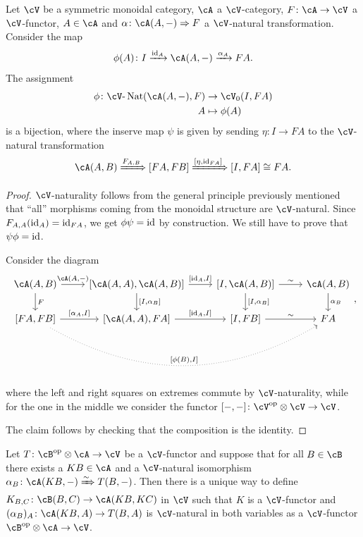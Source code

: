 \documentclass[a4paper,11pt,oneside,openany]{scrbook}
\begin{document}
\begin{thm}
    Let $\cV$ be a symmetric monoidal category, $\cA$ a $\cV$-category, $F\colon\cA\rightarrow\cV$ a $\cV$-functor, $A\in\cA$ and $\alpha\colon\cA(A,-)\Rightarrow F$ a $\cV$-natural transformation. Consider the map$$\phi(A)\colon I\xrightarrow{\id_A}\cA(A,-)\xrightarrow{\alpha_A}FA.$$
    The assignment
    \begin{align*}
        \phi\colon\cV\text{-}\Nat(\cA(A,-),F) &\rightarrow\cV_0(I,FA) \\
        A &\mapsto\phi(A)
    \end{align*}
    is a bijection, where the inserve map $\psi$ is given by sending $\eta\colon I\rightarrow FA$ to the $\cV$-natural transformation
    $$\cA(A,B)\xRightarrow{F_{A,B}}[FA,FB]\xRightarrow{[\eta,\id_{FA}]}[I,FA]\cong FA.$$
\end{thm}

\begin{proof}
    $\cV$-naturality follows from the general principle previously mentioned that ``all'' morphisms coming from the monoidal structure are $\cV$-natural. Since $F_{A,A}(\operatorname{id}_A)=\operatorname{id}_{FA}$, we get $\phi\psi=\operatorname{id}$ by construction. We still have to prove that $\psi\phi=\operatorname{id}$.
    
    Consider the diagram
    \[
    \begin{tikzcd}
        \cA(A,B)\ar[r, "{\cA(A,-)}"]\ar[d, "F"]
        & {[\cA(A,A),\cA(A,B)]}\ar[r, "{[\id_A,I]}"]\ar[d, "{[I,\alpha_B]}"]
        & {[I,\cA(A,B)]}\ar[r, "\sim"]\ar[d, "{[I,\alpha_B]}"]
        & \cA(A,B)\ar[d, "\alpha_B"] \\
        {[FA,FB]}\ar[r, "{[\alpha_A,I]}"]\ar[rrr, bend right, dotted, "{[\phi(B),I]}"]
        & {[\cA(A,A),FA]}\ar[r, "{[\id_A,I]}"]
        & {[I,FB]}\ar[r, "\sim"]
        & FA
    \end{tikzcd}
    ,\]
    where the left and right squares on extremes commute by $\cV$-naturality, while for the one in the middle we consider the functor $[-,-]\colon\cV^{\op}\otimes\cV\rightarrow\cV$.
    
    The claim follows by checking that the composition is the identity.
\end{proof}

\begin{thm}
    Let $T\colon\cB^{\op}\otimes\cA\rightarrow\cV$ be a $\cV$-functor and suppose that for all $B\in\cB$ there exists a $KB\in\cA$ and a $\cV$-natural isomorphism $\alpha_B\colon\cA(KB,-)\xRightarrow{\sim} T(B,-)$. Then there is a unique way to define $K_{B,C}\colon\cB(B,C)\rightarrow\cA(KB,KC)$ in $\cV$ such that $K$ is a $\cV$-functor and $(\alpha_B)_A\colon\cA(KB,A)\rightarrow T(B,A)$ is $\cV$-natural in both variables as a $\cV$-functor $\cB^{\op}\otimes\cA\rightarrow\cV$.
\end{thm}
\end{document}

